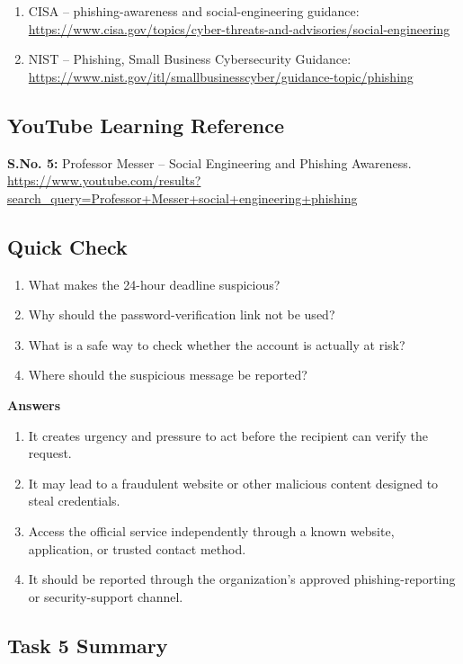 \documentclass[12pt,a4paper]{article}
\begin{document}
\begin{enumerate}
    \item CISA -- phishing-awareness and social-engineering guidance: \url{https://www.cisa.gov/topics/cyber-threats-and-advisories/social-engineering}
    \item NIST -- Phishing, Small Business Cybersecurity Guidance: \url{https://www.nist.gov/itl/smallbusinesscyber/guidance-topic/phishing}
\end{enumerate}

\subsection{YouTube Learning Reference}

\textbf{S.No. 5:} Professor Messer -- Social Engineering and Phishing Awareness.\\
\url{https://www.youtube.com/results?search_query=Professor+Messer+social+engineering+phishing}

\subsection{Quick Check}

\begin{enumerate}
    \item What makes the 24-hour deadline suspicious?
    \item Why should the password-verification link not be used?
    \item What is a safe way to check whether the account is actually at risk?
    \item Where should the suspicious message be reported?
\end{enumerate}

\textbf{Answers}
\begin{enumerate}
    \item It creates urgency and pressure to act before the recipient can verify the request.
    \item It may lead to a fraudulent website or other malicious content designed to steal credentials.
    \item Access the official service independently through a known website, application, or trusted contact method.
    \item It should be reported through the organization's approved phishing-reporting or security-support channel.
\end{enumerate}

\subsection{Task 5 Summary}
\end{document}
